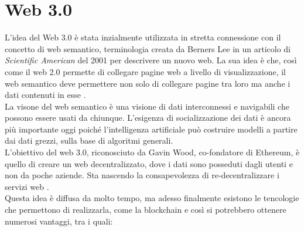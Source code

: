 \section{Web 3.0}
L'idea del Web 3.0 è stata inzialmente utilizzata in stretta connessione con il concetto di web semantico, terminologia creata da Berners Lee in un articolo di \textit{Scientific American} del 2001 per descrivere un nuovo web. 
La sua idea è che, così come il web 2.0 permette di collegare pagine web a livello di visualizzazione, il web semantico deve permettere non solo di collegare pagine tra loro ma anche i dati contenuti in esse \cite{ted_youtube}.
\\La visone del web semantico è una visione di dati interconnessi e navigabili che possono essere usati da chiunque. L'esigenza di socializzazione dei dati è ancora più importante oggi poiché l'intelligenza artificiale può costruire modelli a partire dai dati grezzi, sulla base di algoritmi generali.
\\L'obiettivo del web 3.0, riconosciuto da Gavin Wood, co-fondatore di Ethereum, è quello di creare un web decentralizzato, dove i dati sono posseduti dagli utenti e non da poche aziende. Sta nascendo la consapevolezza di re-decentralizzare i servizi web \cite{Blockchain_tecnologia_e_applicazioni_per_il_business}.
\\Questa idea è diffusa da molto tempo, ma adesso finalmente esistono le tencologie che permettono di realizzarla, come la blockchain 
e così si potrebbero ottenere numerosi vantaggi, tra i quali:

